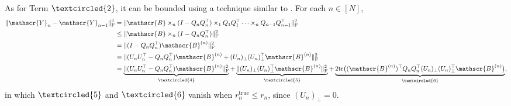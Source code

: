 \documentclass{article}
\newcommand{\T}[2][]{#1\mathscr{\MakeUppercase{#2}}}
\newcommand{\norm}[1]{\Vert #1 \Vert}
\newcommand{\fnorm}[1]{\norm{#1}_{\mathrm{F}}}
\theoremstyle{plain}
\begin{document}
As for Term $\textcircled{2}$, it can be bounded using a technique similar to \cite[Lemma B.1]{sun2019low}.
For each $n \in [N]$,
\begin{equation}
	\begin{aligned}
		\fnorm{\T{Y}_{n} - \T{Y}_{n-1}}^2 &= \fnorm{\T{B}\times_n (I - Q_{n} Q_{n}^\top)\times_{1} Q_{1}Q_{1}^\top \dots \times_n Q_{n-1} Q_{n-1}^\top}^2 \\
		&\leq \fnorm{\T{B}\times_{n} (I - Q_{n} Q_{n}^\top)}^2 \\
		& = \fnorm{(I - Q_{n}Q_{n}^\top)\T{B}^{(n)}}^2 \\
		& = \fnorm{(U_n U_n^\top - Q_{n}Q_{n}^\top)\T{B}^{(n)} + (U_n)_\perp (U_n)_\perp^\top \T{B}^{(n)}}^2 \\
		& =  \underbrace{\fnorm{(U_n U_n^\top - Q_n Q_n^\top) \T{B}^{(n)}}^2}_{\textcircled{4}} + \underbrace{\fnorm{(U_n)_\perp (U_n)_\perp^\top \T{B}^{(n)}}^2}_{\textcircled{5}} + \underbrace{2 \mathrm{tr} \big((\T{B}^{(n)})^\top Q_n Q_n^\top (U_n)_\perp (U_n)_\perp^\top \T{B}^{(n)}\big)}_{\textcircled{6}}, \\
	\end{aligned}
	\nonumber
\end{equation}
in which $\textcircled{5}$ and $\textcircled{6}$ vanish when $r_n^\mathrm{true} \leq r_n$, since $(U_n)_\perp = 0$.
\end{document}
